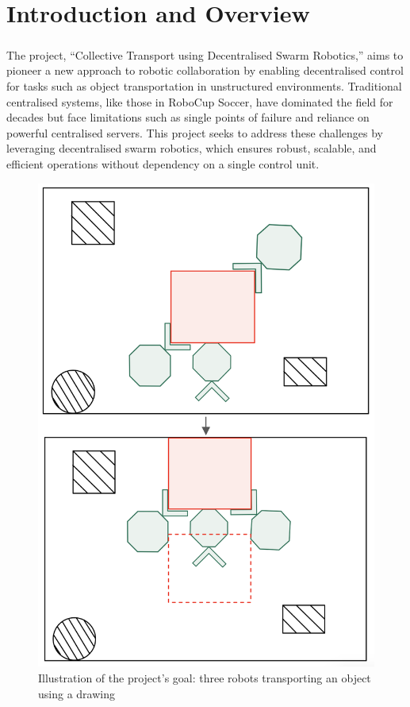 \chapter{Introduction and Overview}
\paragraph*{}
The project, “Collective Transport using Decentralised Swarm Robotics,” aims to pioneer a new approach to robotic collaboration by enabling decentralised control for tasks such as object transportation in unstructured environments. Traditional centralised systems, like those in RoboCup Soccer, have dominated the field for decades but face limitations such as single points of failure and reliance on powerful centralised servers. This project seeks to address these challenges by leveraging decentralised swarm robotics, which ensures robust, scalable, and efficient operations without dependency on a single control unit.
\begin{figure}
    \centering
    \includegraphics[width=0.75\linewidth]{assets/images/introduction/robot-transport-draw.png}
    \caption{Illustration of the project's goal: three robots transporting an object using a drawing}
    \label{fig:robot-transport-draw}
\end{figure}

